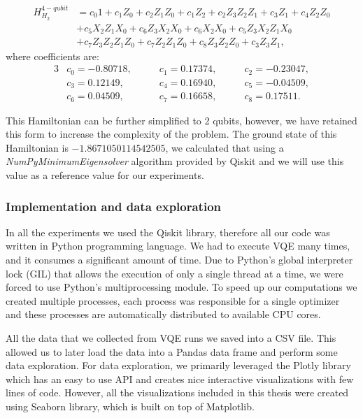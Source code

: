 \begin{align*}H_{H_2}^{4-qubit} &= c_{0}1 + c_{1}Z_{0} + c_{2}Z_{1}Z_{0} + c_{1}Z_{2} + c_{2}Z_{3}Z_{2}Z_{1} + c_{3}Z_{1} + c_{4}Z_{2}Z_{0}\\
                                &+ c_{5}X_{2}Z_{1}X_{0} + c_{6}Z_{3}X_{2}X_{0} + c_{6}X_{2}X_{0} + c_{5}Z_{3}X_{2}Z_{1}X_{0}\\
                                &+c_{7}Z_{3}Z_{2}Z_{1}Z_{0} + c_{7}Z_{2}Z_{1}Z_{0} + c_{8}Z_{3}Z_{2}Z_{0} + c_{3}Z_{3}Z_{1},
\end{align*}
where coefficients are:
\begin{alignat*}{3}
    &c_0 = -0.80718,\qquad &c_1 = 0.17374,\qquad &c_2 =-0.23047, \\
    &c_3 = 0.12149,\qquad  &c_4 = 0.16940,\qquad &c_5 = -0.04509, \\
    &c_6 = 0.04509,\qquad  &c_7 = 0.16658,\qquad &c_8 = 0.17511.
\end{alignat*}

This Hamiltonian can be further simplified to 2 qubits, however, we have retained this form to increase the complexity of the problem. The ground state of this Hamiltonian is $-1.8671050114542505$, we calculated that using a \textit{NumPyMinimumEigensolver} algorithm provided by Qiskit and we will use this value as a reference value for our experiments.

\subsubsection{Implementation and data exploration}
In all the experiments we used the Qiskit library, therefore all our code was written in Python programming language. We had to execute VQE many times, and it consumes a significant amount of time. Due to Python's global interpreter lock (GIL) that allows the execution of only a single thread at a time, we were forced to use Python's multiprocessing module. To speed up our computations we created multiple processes, each process was responsible for a single optimizer and these processes are automatically distributed to available CPU cores.

All the data that we collected from VQE runs we saved into a CSV file. This allowed us to later load the data into a Pandas data frame and perform some data exploration. For data exploration, we primarily leveraged the Plotly library which has an easy to use API and creates nice interactive visualizations with few lines of code. However, all the visualizations included in this thesis were created using Seaborn library, which is built on top of Matplotlib.

